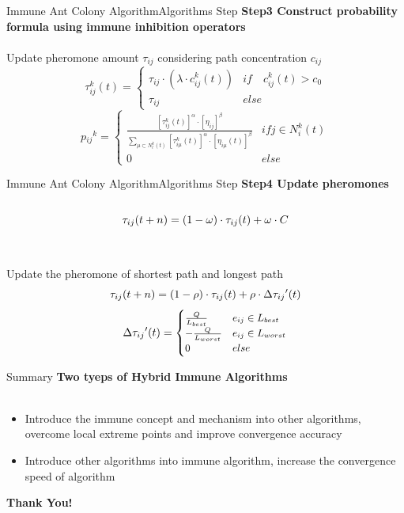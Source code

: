 \begin{frame}{Immune Ant Colony Algorithm}{Algorithms Step}
\large \textbf{Step3 Construct probability formula using immune inhibition operators}\\~\\
\centering \small {Update pheromone amount $\tau_{ij}$ considering path concentration $c_{ij}$}
\begin{equation}
\tau_{ij}^k(t)=
\begin{cases}
\tau_{ij} \cdot \left(\lambda \cdot c_{ij}^k(t)\right) & if \quad c_{ij}^k(t) > c_0 \\
\tau_{ij} & else
\end{cases}
\end{equation}
\begin{equation}
p{_{ij}}^{k} =
\begin{cases}
\frac{[\tau_{ij}^k(t)]^\alpha \cdot [\eta_{ij}]^\beta} { \sum\limits_{\mu \subset N^k_l(t)} [\tau_{i\mu}^k(t)]^\alpha \cdot [\eta_{i\mu}(t)]^\beta} & if j \in N^k_i(t) \\
0 & else
\end{cases}
\end{equation}
\end{frame}

\begin{frame}{Immune Ant Colony Algorithm}{Algorithms Step}
\large \textbf{Step4 Update pheromones}\\~\\
\begin{equation} \small{
\tau_{ij}(t+n) = (1-\omega)\cdot\tau_{ij}(t)+\omega\cdot C}
\end{equation} \\~\\
\centering \small {Update the pheromone of shortest path and longest path}
\begin{equation}\small{
\tau_{ij}(t+n) = (1-\rho)\cdot\tau_{ij}(t)+\rho\cdot \Delta{\tau_{ij}}'(t)}
\end{equation}
\begin{equation} \small{
\Delta{\tau_{ij}}'(t) = 
\begin{cases}
\frac{Q}{L_{best}} & e_{ij} \in L_{best} \\
-\frac{Q}{L_{worst}} & e_{ij} \in L_{worst} \\
0 & else
\end{cases}}
\end{equation}
\end{frame}

\begin{frame}{Summary}
\large \textbf{Two tyeps of Hybrid Immune Algorithms} \\~\\
\begin{itemize}
\item{Introduce the immune concept and mechanism into other algorithms, overcome local extreme points and improve convergence accuracy}
\item{Introduce other algorithms into immune algorithm, increase the convergence speed of algorithm}
\end{itemize}
\end{frame}

\begin{frame}
\centering \Huge \textbf{Thank You!}
\end{frame}
